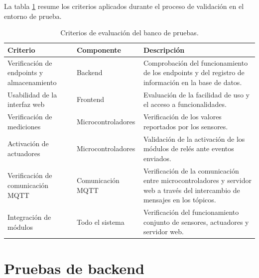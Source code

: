 La tabla \ref{tab:criterios_evaluacion} resume los criterios aplicados durante
el proceso de validación en el entorno de prueba.

\begin{table}[H]
    \centering
    \caption[Criterios de evaluación del banco de pruebas]{Criterios de evaluación del banco de pruebas.}
    \begin{tabular}{p{3.4cm}p{3cm}p{6cm}}
        \hline
        \textbf{Criterio}                          & \textbf{Componente} & \textbf{Descripción}                                                                                                         \\
        \hline
        Verificación de endpoints y almacenamiento & Backend             & Comprobación del funcionamiento de los endpoints y del registro de información en la base de datos.                          \\
        \hline
        Usabilidad de la interfaz web              & Frontend            & Evaluación de la facilidad de uso y el acceso a funcionalidades.                                                             \\
        \hline
        Verificación de mediciones                 & Microcontroladores  & Verificación de los valores reportados por los sensores.                                                                     \\
        \hline
        Activación de actuadores                   & Microcontroladores  & Validación de la activación de los módulos de relés ante eventos enviados.                                                   \\
        \hline
        Verificación de comunicación MQTT          & Comunicación MQTT   & Verificación de la comunicación entre microcontroladores y servidor web a través del intercambio de mensajes en los tópicos. \\
        \hline
        Integración de módulos                     & Todo el sistema     & Verificación del funcionamiento conjunto de sensores, actuadores y servidor web.                                             \\
        \hline
    \end{tabular}
    \label{tab:criterios_evaluacion}
\end{table}

\section{Pruebas de backend}
\label{sec:pruebas_backend}

